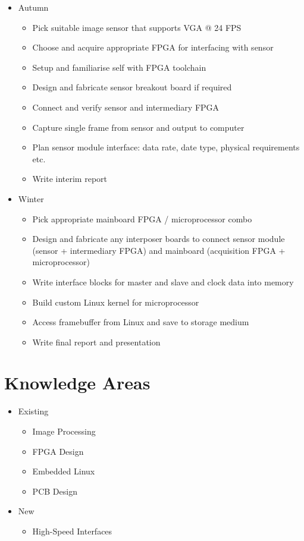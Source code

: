 \documentclass[a4paper]{article}
\begin{document}
\begin{itemize}
    \item Autumn
    \begin{itemize}
        \item Pick suitable image sensor that supports VGA @ 24 FPS
        \item Choose and acquire appropriate FPGA for interfacing with sensor
        \item Setup and familiarise self with FPGA toolchain
        \item Design and fabricate sensor breakout board if required
        \item Connect and verify sensor and intermediary FPGA
        \item Capture single frame from sensor and output to computer
        \item Plan sensor module interface: data rate, date type, physical requirements etc.
        \item Write interim report
    \end{itemize}
    \item Winter
    \begin{itemize}
        \item Pick appropriate mainboard FPGA / microprocessor combo
        \item Design and fabricate any interposer boards to connect sensor module (sensor + intermediary FPGA) and mainboard (acquisition FPGA + microprocessor)
        \item Write interface blocks for master and slave and clock data into memory
        \item Build custom Linux kernel for microprocessor
        \item Access framebuffer from Linux and save to storage medium
        \item Write final report and presentation
    \end{itemize}
\end{itemize}

\section{Knowledge Areas}

\begin{itemize}
    \item Existing
    \begin{itemize}
        \item Image Processing
        \item FPGA Design
        \item Embedded Linux
        \item PCB Design
    \end{itemize}
    \item{New}
    \begin{itemize}
        \item High-Speed Interfaces
    \end{itemize}
\end{itemize}
\end{document}
